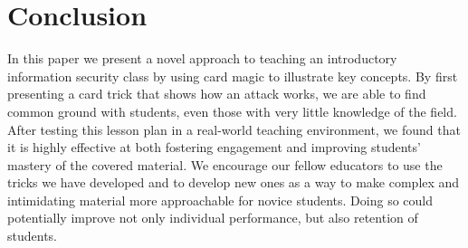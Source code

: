 \section{Conclusion}
\label{SEC:conclusion}

In this paper we present a novel approach to teaching
an introductory information security
class by using card magic to illustrate key concepts.
By first presenting a card trick that shows how an attack works,
we are able to find common ground with students,
even those with very little knowledge of the field.
After testing this lesson plan in a
real-world teaching environment,
we found that it is highly effective at both
fostering engagement and improving students' mastery of the covered
material.
We encourage our fellow educators to use the tricks we have developed and to
develop new ones as a way to make complex and intimidating
material more approachable for novice students.
Doing so could potentially improve not only individual performance, but also
retention of students.
